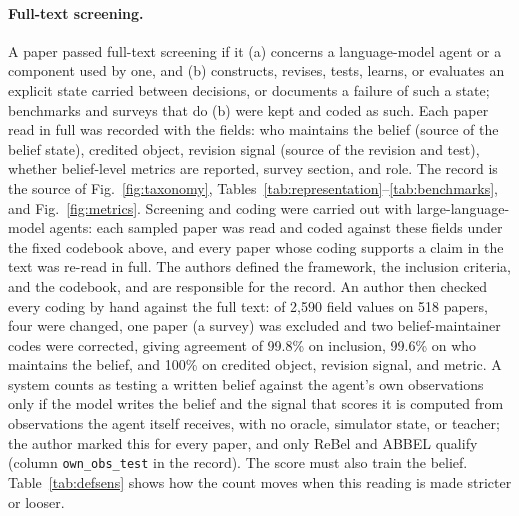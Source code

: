 \paragraph{Full-text screening.}
A paper passed full-text screening if it (a) concerns a language-model agent or a component used by one, and (b) constructs, revises, tests, learns, or evaluates an explicit state carried between decisions, or documents a failure of such a state; benchmarks and surveys that do (b) were kept and coded as such. Each paper read in full was recorded with the fields: who maintains the belief (source of the belief state), credited object, revision signal (source of the revision and test), whether belief-level metrics are reported, survey section, and role. The record is the source of Fig.~\ref{fig:taxonomy}, Tables~\ref{tab:representation}--\ref{tab:benchmarks}, and Fig.~\ref{fig:metrics}. Screening and coding were carried out with large-language-model agents: each sampled paper was read and coded against these fields under the fixed codebook above, and every paper whose coding supports a claim in the text was re-read in full. The authors defined the framework, the inclusion criteria, and the codebook, and are responsible for the record. An author then checked every coding by hand against the full text: of 2{,}590 field values on 518 papers, four were changed, one paper (a survey) was excluded and two belief-maintainer codes were corrected, giving agreement of 99.8\% on inclusion, 99.6\% on who maintains the belief, and 100\% on credited object, revision signal, and metric. A system counts as testing a written belief against the agent's own observations only if the model writes the belief and the signal that scores it is computed from observations the agent itself receives, with no oracle, simulator state, or teacher; the author marked this for every paper, and only ReBel and ABBEL qualify (column \texttt{own\_obs\_test} in the record). The score must also train the belief. Table~\ref{tab:defsens} shows how the count moves when this reading is made stricter or looser.

